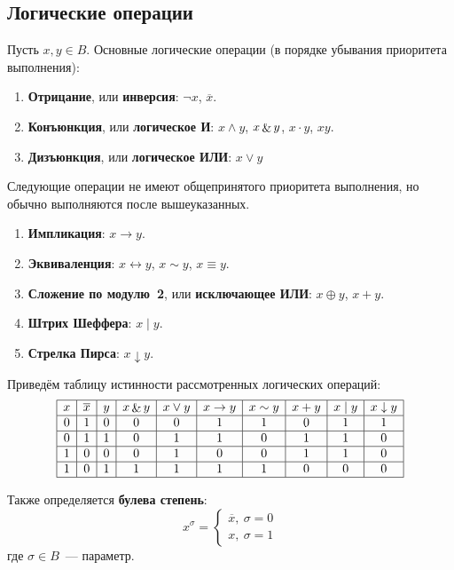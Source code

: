 \subsection{Логические операции}
Пусть $x, y \in B$.
 Основные логические операции (в порядке убывания приоритета выполнения):
\begin{enumerate}
	\item {}  \textbf{Отрицание}, или \textbf{инверсия}: $\lnot x$, $\overline x$.
	\item {} \textbf{Конъюнкция}, или \textbf{логическое И}: $x \land y$, $x \mathop{\&} y$, $x \cdot y$, $xy$.
	\item {} \textbf{Дизъюнкция}, или \textbf{логическое ИЛИ}: $x \lor y$
\end{enumerate}

Следующие операции не имеют общепринятого приоритета выполнения, но обычно выполняются после вышеуказанных.
\begin{enumerate}
	\item \textbf{Импликация}: $x \rightarrow y$.
	\item \textbf{Эквиваленция}: $x \leftrightarrow y$, $x \sim y$, $x \equiv y$.
	\item \textbf{Сложение по модулю~2}, или \textbf{исключающее ИЛИ}: $x \oplus y$, $x + y$.
	\item \textbf{Штрих Шеффера}: $x \mid y$.
	\item \textbf{Стрелка Пирса}: $x \downarrow y$.
\end{enumerate}

Приведём таблицу истинности рассмотренных логических операций:
\begin{equation*}
\begin{array}{|c|c|c|c|c|c|c|c|c|c|}
\hline
x & \overline x & y & x \mathop{\&} y & x \lor y & x \rightarrow y & x \sim y & x + y & x \mid y & x \downarrow y \\
\hline
0 & 1 & 0 & 0 & 0 & 1 & 1 & 0 & 1 & 1 \\
\hline
0 & 1 & 1 & 0 & 1 & 1 & 0 & 1 & 1 & 0 \\
\hline
1 & 0 & 0 & 0 & 1 & 0 & 0 & 1 & 1 & 0 \\
\hline
1 & 0 & 1 & 1 & 1 & 1 & 1 & 0 & 0 & 0 \\
\hline
\end{array}
\end{equation*}

 Также определяется \textbf{булева степень}:
\begin{equation*}
x^\sigma =
\begin{cases}
\overline x, \ \sigma = 0 \\
x, \ \sigma = 1
\end{cases}
\end{equation*}
где $\sigma \in B$~--- параметр.